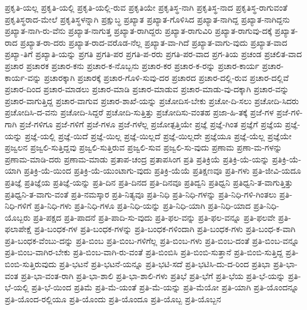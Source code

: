 {ಪ್ರಕೃತಿ-ಯಲ್ಲ
ಪ್ರಕೃತಿ-ಯಲ್ಲಿ
ಪ್ರಕೃತಿ-ಯಲ್ಲಿ-ರುವ
ಪ್ರಕೃತಿಯೇ
ಪ್ರಕೃತಿಸ್ಥ-ನಾಗಿ
ಪ್ರಕೃತಿಸ್ಥ-ನಾದ
ಪ್ರಕೃತಿಸ್ಥ-ರಾಗುವಂತೆ
ಪ್ರಕೃತಿಸ್ಥರಾದ-ಮೇಲೆ
ಪ್ರಕೃತಿಸ್ಥಳನ್ನಾಗಿ
ಪ್ರಕ್ಷುಬ್ಧ
ಪ್ರಖ್ಯಾತ
ಪ್ರಖ್ಯಾತ-ಗೊಳಿಸಿದ
ಪ್ರಖ್ಯಾತ-ನಾಗಿದ್ದ
ಪ್ರಖ್ಯಾತ-ನಾಗಿದ್ದನು
ಪ್ರಖ್ಯಾತ-ನಾಗಿ-ರು-ವೆನು
ಪ್ರಖ್ಯಾತ-ನಾಗುತ್ತ
ಪ್ರಖ್ಯಾತ-ರಾಗಿದ್ದರು
ಪ್ರಖ್ಯಾತ-ರಾಗುವಿರಿ
ಪ್ರಖ್ಯಾತ-ರಾಗುವು-ದಕ್ಕೆ
ಪ್ರಖ್ಯಾತ-ರಾದ
ಪ್ರಖ್ಯಾತ-ರಾ-ದರು
ಪ್ರಖ್ಯಾತ-ರಾದ-ವರೊಡ-ನೆಲ್ಲ
ಪ್ರಖ್ಯಾತ-ವಾ-ಗಿದೆ
ಪ್ರಖ್ಯಾತ-ವಾಗು-ವುದು
ಪ್ರಖ್ಯಾತ-ವಾದ
ಪ್ರಖ್ಯಾ-ತಿಗೆ
ಪ್ರಖ್ಯಾತಿ-ಯನ್ನು
ಪ್ರಗತಿ
ಪ್ರಗತಿ-ಪರ
ಪ್ರಗತಿ-ಪ-ರರು
ಪ್ರಗತಿ-ಪರ-ವಾದ
ಪ್ರಗ-ತಿಯ
ಪ್ರಚಂಡ
ಪ್ರಚಲಿತ-ವಾದ
ಪ್ರಚಾರ
ಪ್ರಚಾರಕ
ಪ್ರಚಾರ-ಕನು
ಪ್ರಚಾರ-ಕ-ನೊಬ್ಬನು
ಪ್ರಚಾರ-ಕರ
ಪ್ರಚಾರ-ಕ-ರನ್ನು
ಪ್ರಚಾರ-ಕಾರ್ಯ
ಪ್ರಚಾರ-ಕಾರ್ಯ-ವನ್ನು
ಪ್ರಚಾರಕ್ಕಾಗಿ
ಪ್ರಚಾರಕ್ಕೆ
ಪ್ರಚಾರ-ಗೊಳಿ-ಸುವು-ದರ
ಪ್ರಚಾರದ
ಪ್ರಚಾರ-ದಲ್ಲಿ-ರುವ
ಪ್ರಚಾರ-ದಲ್ಲಿವೆ
ಪ್ರಚಾರ-ದಿಂದ
ಪ್ರಚಾರ-ಮಾಡಲು
ಪ್ರಚಾರ-ಮಾಡಿ
ಪ್ರಚಾರ-ಮಾಡುವ
ಪ್ರಚಾರ-ಮಾಡು-ವು-ದಕ್ಕಾಗಿ
ಪ್ರಚಾರ-ವನ್ನು
ಪ್ರಚಾರ-ವಾಗುತ್ತಿದ್ದ
ಪ್ರಚಾರ-ವಾಗುವ
ಪ್ರಚಾರ-ಶಾಖೆ-ಯನ್ನು
ಪ್ರಚೋದಿಸ-ಬೇಕು
ಪ್ರಚೋ-ದಿ-ಸಲು
ಪ್ರಚೋದಿ-ಸಿದರು
ಪ್ರಚೋದಿಸಿ-ದ-ವನು
ಪ್ರಚೋದಿ-ಸಿದ್ದರೆ
ಪ್ರಚೋದಿ-ಸುತ್ತಿತ್ತು
ಪ್ರಚೋದಿಸು-ವಂತಹ
ಪ್ರಜಾ-ಹಿ-ತಕ್ಕೆ
ಪ್ರಜೆ-ಗಳ
ಪ್ರಜೆ-ಗಳಿ-ಗಾಗಿ
ಪ್ರಜೆ-ಗಳಿಗೂ
ಪ್ರಜೆ-ಗಳಿಗೆ
ಪ್ರಜೆ-ಗಳೂ
ಪ್ರಜೆ-ಗಳೆಲ್ಲ
ಪ್ರಜೋತ್ಪತ್ತಿಯೇ
ಪ್ರಜ್ಞೆ
ಪ್ರಜ್ಞೆ-ಗಿಂತ
ಪ್ರಜ್ಞೆಗೆ
ಪ್ರಜ್ಞೆಯ
ಪ್ರಜ್ಞೆ-ಯನ್ನು
ಪ್ರಜ್ಞೆ-ಯಲ್ಲಿ
ಪ್ರಜ್ಞೆ-ಯಿದೆ
ಪ್ರಜ್ಞೆ-ಯಿಲ್ಲ
ಪ್ರಜ್ಞೆ-ಯಿಲ್ಲದೆ
ಪ್ರಜ್ಞೆ-ಯಿಲ್ಲದೇ
ಪ್ರಜ್ಞೆಯೂ
ಪ್ರಜ್ಞೆ-ಯೆಲ್ಲ
ಪ್ರಜ್ಞೆಯೇ
ಪ್ರಜ್ವಲನ
ಪ್ರಜ್ವಲಿ-ಸುತ್ತಿದ್ದವು
ಪ್ರಜ್ವಲಿ-ಸುತ್ತಿರುವ
ಪ್ರಜ್ವಲಿ-ಸುವ
ಪ್ರಜ್ವಲಿ-ಸು-ವುದು
ಪ್ರಣಾಮ
ಪ್ರಣಾ-ಮ-ಗಳನ್ನು
ಪ್ರಣಾಮ-ಮಾಡಿ-ದರು
ಪ್ರಣಾಮ-ಮಾಡು
ಪ್ರತಾಪ-ಚಂದ್ರ
ಪ್ರತಾಪಸಿಂಗ
ಪ್ರತಿ
ಪ್ರತಿಕ್ರಿಯೆ
ಪ್ರತಿಕ್ರಿ-ಯೆ-ಯನ್ನು
ಪ್ರತಿಕ್ರಿ-ಯೆ-ಯಾಗಿ
ಪ್ರತಿಕ್ರಿ-ಯೆ-ಯಿಂದ
ಪ್ರತಿಕ್ರಿ-ಯೆ-ಯುಂಟಾಗು-ವುದು
ಪ್ರತಿಕ್ರಿ-ಯೆಯೆ
ಪ್ರತಿಕ್ಷಣವೂ
ಪ್ರತಿ-ಗಳು
ಪ್ರತಿ-ಜೀವಿ-ಯದೂ
ಪ್ರತಿಜ್ಞೆ
ಪ್ರತಿಜ್ಞೆಯ
ಪ್ರತಿಜ್ಞೆ-ಯನ್ನು
ಪ್ರತಿ-ದಿನ
ಪ್ರತಿ-ದಿನದ
ಪ್ರತಿ-ದಿನವೂ
ಪ್ರತಿದ್ವನಿ
ಪ್ರತಿಧ್ವನಿ
ಪ್ರತಿಧ್ವನಿ-ತ-ವಾಗುತ್ತಿತ್ತು
ಪ್ರತಿಧ್ವನಿ-ತ-ವಾಗು-ವಂತೆ
ಪ್ರತಿ-ನಮಸ್ಕಾರ
ಪ್ರತಿ-ನಿತ್ಯವೂ
ಪ್ರತಿ-ನಿಧಿ
ಪ್ರತಿ-ನಿಧಿ-ಗಳನ್ನು
ಪ್ರತಿ-ನಿಧಿ-ಗಳಿ-ಗಿಂತಲು
ಪ್ರತಿ-ನಿಧಿ-ಗಳಿಗೆ
ಪ್ರತಿ-ನಿಧಿ-ಗಳು
ಪ್ರತಿ-ನಿಧಿ-ಗಳೂ
ಪ್ರತಿ-ನಿಧಿ-ಯನ್ನು
ಪ್ರತಿ-ನಿಧಿ-ಯಾಗಿ
ಪ್ರತಿ-ನಿಧಿ-ಯಾದ
ಪ್ರತಿ-ನಿಧಿ-ಯೊಬ್ಬರು
ಪ್ರತಿ-ಪಕ್ಷದ
ಪ್ರತಿ-ಪಾದನೆ
ಪ್ರತಿ-ಪಾದಿ-ಸು-ವುದು
ಪ್ರತಿ-ಫಲ-ವನ್ನು
ಪ್ರತಿ-ಫಲ-ವನ್ನೂ
ಪ್ರತಿ-ಫಲವೇ
ಪ್ರತಿ-ಫಲಾಪೇಕ್ಷೆ
ಪ್ರತಿ-ಬಂಧಕ-ಗಳ
ಪ್ರತಿ-ಬಂಧಕ-ಗಳನ್ನು
ಪ್ರತಿ-ಬಂಧಕ-ಗಳಿಂದಾಗಿ
ಪ್ರತಿ-ಬಂಧಕ-ಗಳು
ಪ್ರತಿ-ಬಂಧ-ಕ-ವಾಗಿ
ಪ್ರತಿ-ಬಂಧಕ-ವೆಂಬು-ದನ್ನು
ಪ್ರತಿ-ಬಿಂಬ
ಪ್ರತಿ-ಬಿಂಬ-ಗಳಿಗೆಲ್ಲ
ಪ್ರತಿ-ಬಿಂಬ-ಗಳು
ಪ್ರತಿ-ಬಿಂಬ-ದಂತೆ
ಪ್ರತಿ-ಬಿಂಬ-ವನ್ನೂ
ಪ್ರತಿ-ಬಿಂಬ-ವಾಗಿರ-ಬೇಕು
ಪ್ರತಿ-ಬಿಂಬ-ವಾಗಿ-ರು-ವಂತೆ
ಪ್ರತಿ-ಬಿಂಬಿಸಿ
ಪ್ರತಿ-ಬಿಂಬಿ-ಸುತ್ತಾನೆ
ಪ್ರತಿ-ಬಿಂಬಿ-ಸುತ್ತಿದ್ದ
ಪ್ರತಿ-ಬಿಂಬಿ-ಸುತ್ತಿರುವುದು
ಪ್ರತಿ-ಭಟನೆ
ಪ್ರತಿ-ಭಟನೆ-ಯನ್ನೂ
ಪ್ರತಿ-ಭಟಿ-ಸದೆ
ಪ್ರತಿ-ಭಟಿಸಿ-ದು-ದ-ರಿಂದ
ಪ್ರತಿಭಾ
ಪ್ರತಿ-ಭಾ-ವಂತ
ಪ್ರತಿ-ಭಾ-ವಂತ-ರಾಗಿ
ಪ್ರತಿ-ಭಾ-ಶಾಲಿ
ಪ್ರತಿ-ಭಾ-ಶಾಲಿ-ಗಳು
ಪ್ರತಿಭೆ
ಪ್ರತಿ-ಭೆಗೆ
ಪ್ರತಿ-ಭೆಯ
ಪ್ರತಿ-ಭೆ-ಯನ್ನು
ಪ್ರತಿ-ಭೆ-ಯಲ್ಲಿ
ಪ್ರತಿ-ಭೆ-ಯಿಂದ
ಪ್ರತಿಮೆ
ಪ್ರತಿ-ಮೆ-ಯಂತೆ
ಪ್ರತಿ-ಮೆ-ಯನ್ನು
ಪ್ರತಿ-ಮೆಯೋ
ಪ್ರತಿ-ಯಾಗಿ
ಪ್ರತಿ-ಯೊಂದನ್ನೂ
ಪ್ರತಿ-ಯೊಂದ-ರಲ್ಲಿಯೂ
ಪ್ರತಿ-ಯೊಂದು
ಪ್ರತಿ-ಯೊಂದೂ
ಪ್ರತಿ-ಯೊಬ್ಬ
ಪ್ರತಿ-ಯೊಬ್ಬನ
}
